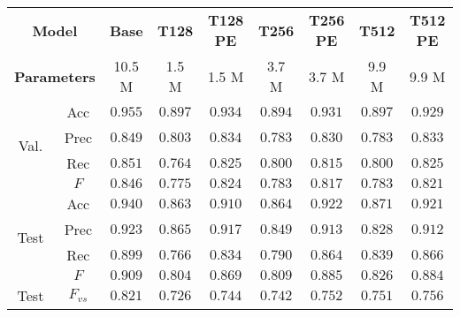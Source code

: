 \begin{tabular}{cc|ccccccc}
    \multicolumn{2}{c|}{\textbf{Model}} & \textbf{Base} & \textbf{T128} & \textbf{T128 PE} & \textbf{T256} & \textbf{T256 PE} & \textbf{T512} & \textbf{T512 PE}\\
    \multicolumn{2}{c|}{\textbf{Parameters}} & 10.5 M & 1.5 M & 1.5 M & 3.7 M & 3.7 M & 9.9 M & 9.9 M \\\hline
    \multirow{4}{*}{Val.} & Acc      & $\mathbf{0.955}$ & $0.897$ & $0.934$ & $0.894$ & $0.931$ & $0.897$ & $0.929$ \\
    & Prec     & $\mathbf{0.849}$ & $0.803$ & $0.834$ & $0.783$ & $0.830$ & $0.783$ & $0.833$ \\
    & Rec      & $\mathbf{0.851}$ & $0.764$ & $0.825$ & $0.800$ & $0.815$ & $0.800$ & $0.825$ \\
    & $F$      & $\mathbf{0.846}$ & $0.775$ & $0.824$ & $0.783$ & $0.817$ & $0.783$ & $0.821$ \\\hline
    \multirow{4}{*}{Test} & Acc      & $\mathbf{0.940}$ & $0.863$ & $0.910$ & $0.864$ & $0.922$ & $0.871$ & $0.921$ \\
    & Prec     & $\mathbf{0.923}$ & $0.865$ & $0.917$ & $0.849$ & $0.913$ & $0.828$ & $0.912$ \\
    & Rec      & $\mathbf{0.899}$ & $0.766$ & $0.834$ & $0.790$ & $0.864$ & $0.839$ & $0.866$ \\
    & $F$      & $\mathbf{0.909}$ & $0.804$ & $0.869$ & $0.809$ & $0.885$ & $0.826$ & $0.884$ \\\hline
    \multirow{1}{*}{Test} & $F_{vs}$ & $\mathbf{0.821}$ & $0.726$ & $0.744$ & $0.742$ & $0.752$ & $0.751$ & $0.756$ \\
\end{tabular}